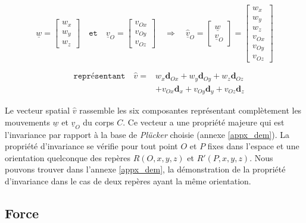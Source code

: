 \documentclass{report}
\begin{document}
\begin{minipage}[c]{.55\textwidth}
$$
\underline{w}=
\begin{bmatrix}
w_{x} \\
w_{y} \\
w_{z}
\end{bmatrix}
\quad \texttt{et} \quad
\underline{v}_{O}=
\begin{bmatrix}
v_{Ox} \\
v_{Oy} \\
v_{Oz}
\end{bmatrix}
\quad \Rightarrow \quad
\underline{\widehat{v}}_{O}=
\begin{bmatrix}
\underline{w} \\
\underline{v}_{O}
\end{bmatrix}
=
\begin{bmatrix}
w_{x} \\
w_{y} \\
w_{z} \\
v_{Ox} \\
v_{Oy} \\
v_{Oz}
\end{bmatrix}
$$
\end{minipage}
\begin{minipage}[c]{.45\textwidth}
\begin{align*}
\quad \texttt{représentant} \quad
\widehat{v} = 
  &w_{x}\textbf{d}_{Ox} + w_{y}\textbf{d}_{Oy} + w_{z}\textbf{d}_{Oz} \\
  &+ v_{Ox}\textbf{d}_{x} + v_{Oy}\textbf{d}_{y} + v_{Oz}\textbf{d}_{z}
\end{align*}
\end{minipage}

\vspace{0.3cm} %

Le vecteur spatial $\widehat{v}$ rassemble les six composantes représentant complètement les mouvements $\underline{w}$ et $\underline{v}_{O}$ du corps $C$. Ce vecteur a une propriété majeure qui est l'invariance par rapport à la base de \emph{Plücker} choisie (annexe \ref{appx_dem}). La propriété d'invariance se vérifie pour tout point $O$ et $P$ fixes dans l'espace et une orientation quelconque des repères $R(O,x,y,z)$ et $R'(P,x,y,z)$. Nous pouvons trouver dans l'annexe \ref{appx_dem}, la démonstration de la propriété d'invariance dans le cas de deux repères ayant la même orientation.


\subsection{Force}
\end{document}
